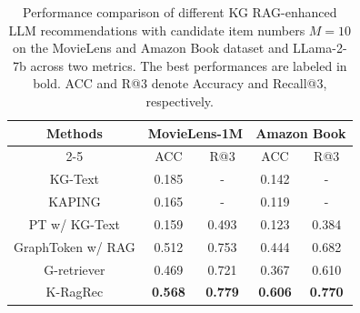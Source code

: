 \begin{table}[t]
  \centering
  \caption{ Performance comparison of different KG RAG-enhanced LLM recommendations with candidate item numbers $M=10$ on the MovieLens and Amazon Book dataset and LLama-2-7b across
two metrics. The best performances are labeled in bold. ACC and R@3 denote Accuracy and Recall@3, respectively. }
    \scalebox{0.65}
{
    \begin{tabular}{c|c|c|c|c}
    \toprule
    \toprule
    \multirow{2}{*}{Methods} & \multicolumn{2}{c|}{MovieLens-1M} & \multicolumn{2}{c}{Amazon Book} \\
    \cmidrule{2-5}
    & \multicolumn{1}{c|}{ACC} & \multicolumn{1}{c|}{R@3} & \multicolumn{1}{c|}{ACC} & \multicolumn{1}{c}{R@3}  \\
    \midrule
    KG-Text &0.185  &- &0.142  &-  \\
    KAPING &0.165  &- & 0.119 &-  \\
    PT w/ KG-Text &0.159  &0.493 &0.123  &0.384  \\
    GraphToken w/ RAG &0.512  &0.753 &0.444  & 0.682 \\
    G-retriever &0.469  &0.721 &0.367  &0.610  \\
    \midrule
 K-RagRec &\textbf{0.568}  &\textbf{0.779} &\textbf{0.606}  &\textbf{0.770}  \\
    \bottomrule
    \bottomrule
    \end{tabular}%
}
  \label{tab:10samples}%
\end{table}%